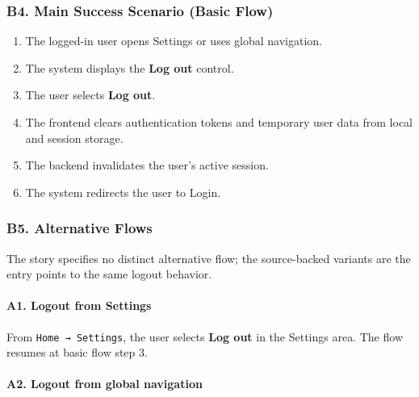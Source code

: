 \documentclass[12pt]{article}
\begin{document}
\hypertarget{sec:b4-main-success-scenario-basic-flow}{}
\subsubsection*{B4. Main Success Scenario (Basic Flow)}
\par\medskip

\begin{enumerate}
\item The logged-in user opens Settings or uses global navigation.
\item The system displays the \textbf{Log out} control.
\item The user selects \textbf{Log out}.
\item The frontend clears authentication tokens and temporary user data from local and session storage.
\item The backend invalidates the user's active session.
\item The system redirects the user to Login.
\end{enumerate}
\par\medskip

\hypertarget{sec:b5-alternative-flows}{}
\subsubsection*{B5. Alternative Flows}
\par\medskip

The story specifies no distinct alternative flow; the source-backed variants are the entry points to the same logout behavior.
\par\medskip

\hypertarget{sec:a1-logout-from-settings}{}
\paragraph*{A1. Logout from Settings}
\par\medskip

From \texttt{Home → Settings}, the user selects \textbf{Log out} in the Settings area. The flow resumes at basic flow step 3.
\par\medskip

\hypertarget{sec:a2-logout-from-global-navigation}{}
\paragraph*{A2. Logout from global navigation}
\par\medskip
\end{document}
